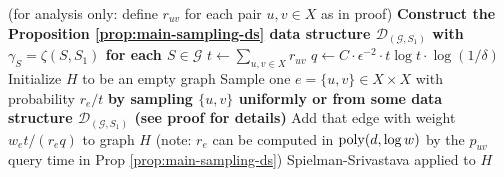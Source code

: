 \begin{algorithm}
\begin{algorithmic}[1]\caption{}
    \State (for analysis only: define $r_{uv}$ for each pair $u,v\in X$ as in proof)
    \State \textbf{Construct the Proposition \ref{prop:main-sampling-ds} data structure $\mathcal D_{(\mathcal G,S_1)}$ with $\gamma_S = \zeta(S,S_1)$ for each $S\in \mathcal G$}
    \State $t \leftarrow \sum_{u,v\in X} r_{uv}$
    \State $q \leftarrow C \cdot \epsilon^{-2} \cdot t \log t \cdot \log(1/\delta)$
    \State Initialize $H$ to be an empty graph
        \State Sample one $e = \{u,v\} \in X\times X$ with probability $r_e/t$ \textbf{by sampling $\{u,v\}$ uniformly or from some data structure $\mathcal D_{(\mathcal G,S_1)}$ (see proof for details)}
        \State Add that edge with weight $w_e t / (r_e q)$ to graph $H$ (note: $r_e$ can be computed in $\mathrm{poly}(d,\log w)$ by the $p_{uv}$ query time in Prop \ref{prop:main-sampling-ds})
    \EndFor
    \State \Return Spielman-Srivastava \cite{ss11} applied to $H$
\EndProcedure
\end{algorithmic}
\end{algorithm}

